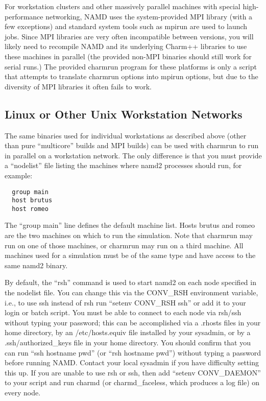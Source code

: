 For workstation clusters and other massively parallel machines with
special high-performance networking, NAMD uses the system-provided MPI
library (with a few exceptions) and standard system tools such as mpirun
are used to launch jobs.  Since MPI libraries are very often incompatible
between versions, you will likely need to recompile NAMD and its
underlying Charm++ libraries to use these machines in parallel (the
provided non-MPI binaries should still work for serial runs.) The provided
charmrun program for these platforms is only a script that attempts to
translate charmrun options into mpirun options, but due to the diversity
of MPI libraries it often fails to work.

\subsection{Linux or Other Unix Workstation Networks}

The same binaries used for individual workstations as described above
(other than pure ``multicore'' builds and MPI builds)
can be used with charmrun to run in parallel on a workstation network.
The only difference is that you must provide a ``nodelist'' file listing
the machines where namd2 processes should run, for example:

\begin{verbatim}
  group main
  host brutus
  host romeo
\end{verbatim}

The ``group main'' line defines the default machine list.  Hosts brutus
and romeo are the two machines on which to run the simulation.  Note
that charmrun may run on one of those machines, or charmrun may run
on a third machine.  All machines used for a simulation must be of the
same type and have access to the same namd2 binary.

By default, the ``rsh'' command is used to start namd2
on each node specified in the nodelist file.  You can change this via
the CONV\_RSH environment variable, i.e., to use ssh instead of rsh run
``setenv CONV\_RSH ssh'' or add it to your login or batch script.  You
must be able to connect to each node via rsh/ssh without typing your
password; this can be accomplished via a .rhosts files in your home
directory, by an /etc/hosts.equiv file installed by your sysadmin, or
by a .ssh/authorized\_keys file in your home directory.  You should
confirm that you can run ``ssh hostname pwd'' (or ``rsh hostname pwd'')
without typing a password before running NAMD.  Contact your local
sysadmin if you have difficulty setting this up.  If you are unable to
use rsh or ssh, then add ``setenv CONV\_DAEMON'' to your script and run 
charmd (or charmd\_faceless, which produces a log file) on every node.

